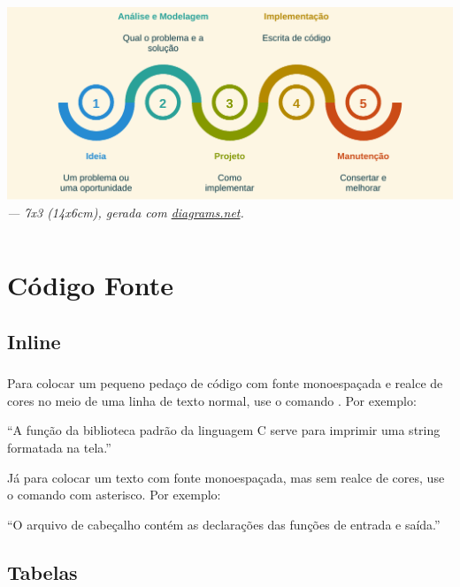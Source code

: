 \documentclass[aspectratio=169]{beamer}
\begin{document}
\begin{frame}[t]\frametitle{\secname}\framesubtitle{\subsecname}
  \begin{columns}[T]
    \begin{column}{\textwidth}
      \includegraphics[width=\columnwidth]{images/pdf/etapas.pdf}%
      \\\small
      \it{} --- 7x3 (14x6cm), gerada com \href{https://app.diagrams.net/}{diagrams.net}.
    \end{column}
  \end{columns}
\end{frame}

\section{Código Fonte}

\subsection{Inline}

\lstset{language=C}
\begin{frame}[t]\frametitle{\secname}\framesubtitle{\subsecname}
  Para colocar um pequeno pedaço de código com fonte monoespaçada e realce de cores no meio de uma linha de texto normal, use o comando .
  Por exemplo:

  ``A função  da biblioteca padrão da linguagem C serve para imprimir uma string formatada na tela.''

  Já para colocar um texto com fonte monoespaçada, mas sem realce de cores, use o comando  com asterisco. Por exemplo:

  ``O arquivo de cabeçalho  contém as declarações das funções de entrada e saída.''
\end{frame}

\subsection{Tabelas}
\end{document}
